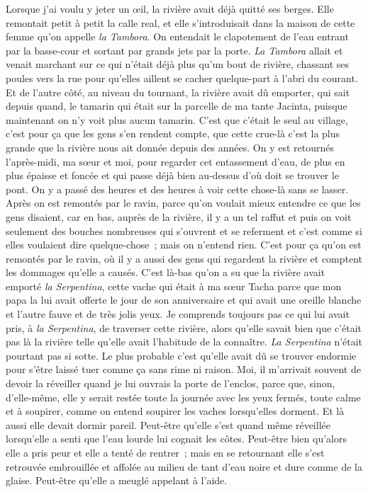 \begin{pages}
\begin{Rightside}
			Lorsque j’ai voulu y jeter un œil, la rivière avait déjà quitté ses berges. Elle remontait petit à petit la calle real, et elle s’introduisait dans la maison de cette femme qu’on appelle \textit{la Tambora}. On entendait le clapotement de l’eau entrant par la basse-cour et sortant par grands jets par la porte. \textit{La Tambora} allait et venait marchant sur ce qui n’était déjà plus qu’un bout de rivière, chassant ses poules vers la rue pour qu’elles aillent se cacher quelque-part à l’abri du courant.
		\pend
		\pstart
			Et de l’autre côté, au niveau du tournant, la rivière avait dû emporter, qui sait depuis quand, le tamarin qui était sur la parcelle de ma tante Jacinta, puisque maintenant on n’y voit plus aucun tamarin. C’est que c’était le seul au village, c’est pour ça que les gens s’en rendent compte, que cette crue-là c’est la plus grande que la rivière nous ait donnée depuis des années.
		\pend
		\pstart
			On y est retournés l’après-midi, ma sœur et moi, pour regarder cet entassement d’eau, de plus en plus épaisse et foncée et qui passe déjà bien au-dessus d’où doit se trouver le pont. On y a passé des heures et des heures à voir cette chose-là sans se lasser. Après on est remontés par le ravin, parce qu’on voulait mieux entendre ce que les gens disaient, car en bas, auprès de la rivière, il y a un tel raffut et puis on voit seulement des bouches nombreuses qui s’ouvrent et se referment et c’est comme si elles voulaient dire quelque-chose ; mais on n’entend rien. C’est pour ça qu’on est remontés par le ravin, où il y a aussi des gens qui regardent la rivière et comptent les dommages qu’elle a causés. C’est là-bas qu’on a su que la rivière avait emporté \textit{la Serpentina}, cette vache qui était à ma sœur Tacha parce que mon papa la lui avait offerte le jour de son anniversaire et qui avait une oreille blanche et l’autre fauve et de très jolis yeux.
		\pend
		\pstart
			Je comprends toujours pas ce qui lui avait pris, à \textit{la Serpentina}, de traverser cette rivière, alors qu’elle savait bien que c’était pas là la rivière telle qu’elle avait l’habitude de la connaître. \textit{La Serpentina} n’était pourtant pas si sotte. Le plus probable c’est qu’elle avait dû se trouver endormie pour s’être laissé tuer comme ça sans rime ni raison. Moi, il m’arrivait souvent de devoir la réveiller quand je lui ouvrais la porte de l’enclos, parce que, sinon, d’elle-même, elle y serait restée toute la journée avec les yeux fermés, toute calme et à soupirer, comme on entend soupirer les vaches lorsqu’elles dorment.
		\pend
		\pstart
			Et là aussi elle devait dormir pareil. Peut-être qu’elle s’est quand même réveillée lorsqu’elle a senti que l’eau lourde lui cognait les côtes. Peut-être bien qu’alors elle a pris peur et elle a tenté de rentrer ; mais en se retournant elle s’est retrouvée embrouillée et affolée au milieu de tant d’eau noire et dure comme de la glaise. Peut-être qu’elle a meuglé appelant à l’aide.

\end{Rightside}
\end{pages}
